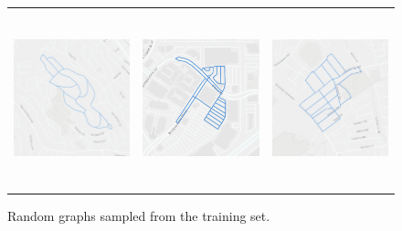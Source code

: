\begin{figure}[t]
\begin{center}
\begin{tabular}{lll}
    \includegraphics[height=5.1cm,trim={0.2cm 0 0.4cm 0},clip]{figs/graph4.png} &
    \includegraphics[height=5.1cm,trim={0.2cm 0 0.4cm 0},clip]{figs/graph5.png} &
    \includegraphics[height=5.1cm,trim={0.2cm 0 0.4cm 0},clip]{figs/graph6.png} \\
  \end{tabular}
  \fi
  \caption{Random graphs sampled from the training set. }
  \label{fig:example_graphs}
  \end{center}
  \vspace{-0.25in}
\end{figure}